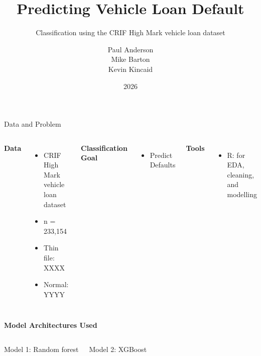 \documentclass[aspectratio=169,t,xcolor=table]{beamer}
\begin{document}
\title{Predicting Vehicle Loan Default}
\subtitle{Classification using the CRIF High Mark vehicle loan dataset}

\author{Paul Anderson\\Mike Barton\\Kevin Kincaid}

\date{2026}
\frame[noframenumbering]{\titlepage}






\begin{frame}{Data and Problem}
    \begin{columns}
        \textbf{Data}
        \begin{itemize}
        \item CRIF High Mark vehicle loan dataset
        \item n = 233,154
        \item Thin file: XXXX
        \item Normal: YYYY
        \end{itemize}
        
        \textbf{Classification Goal}
        \begin{itemize}
        \item Predict Defaults
        \end{itemize}
        
        \textbf{Tools}
        \begin{itemize}
            \item R: for EDA, cleaning, and modelling
        \end{itemize}
        
    \end{columns}
    \vspace{1cm}
    \textbf{ Model Architectures Used}
    \vspace{.25cm}
    
    \begin{columns}
        Model 1: Random forest
        
        Model 2: XGBoost

    \end{columns}
    
\end{frame}
\end{document}
